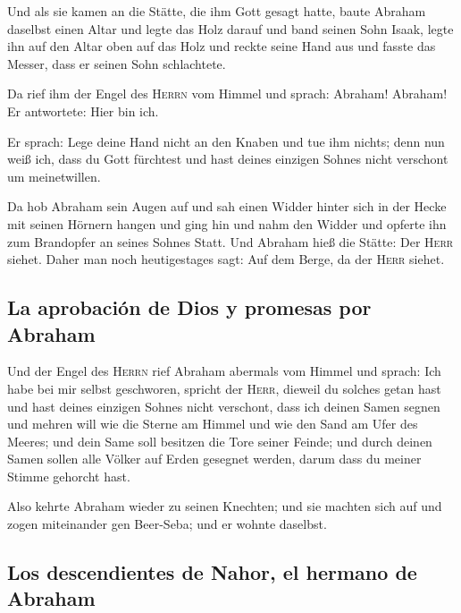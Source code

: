  Und als sie kamen an die Stätte, die ihm Gott gesagt
hatte, baute Abraham daselbst einen Altar und legte das Holz darauf und
band seinen Sohn Isaak, legte ihn auf den Altar oben auf das Holz
 und reckte seine Hand aus und fasste das Messer, dass er
seinen Sohn schlachtete.

 Da rief ihm der Engel des \textsc{Herrn} vom Himmel und
sprach: Abraham! Abraham! Er antwortete: Hier bin ich.

 Er sprach: Lege deine Hand nicht an den Knaben und tue
ihm nichts; denn nun weiß ich, dass du Gott fürchtest und hast deines
einzigen Sohnes nicht verschont um meinetwillen.

 Da hob Abraham sein Augen auf und sah einen Widder
hinter sich in der Hecke mit seinen Hörnern hangen und ging hin und nahm
den Widder und opferte ihn zum Brandopfer an seines Sohnes Statt.
 Und Abraham hieß die Stätte: Der \textsc{Herr} siehet.
Daher man noch heutigestages sagt: Auf dem Berge, da der \textsc{Herr}
siehet.

\hypertarget{la-aprobaciuxf3n-de-dios-y-promesas-por-abraham}{%
\subsection{La aprobación de Dios y promesas por
Abraham}\label{la-aprobaciuxf3n-de-dios-y-promesas-por-abraham}}

 Und der Engel des \textsc{Herrn} rief Abraham abermals
vom Himmel  und sprach: Ich habe bei mir selbst
geschworen, spricht der \textsc{Herr}, dieweil du solches getan hast und
hast deines einzigen Sohnes nicht verschont,  dass ich
deinen Samen segnen und mehren will wie die Sterne am Himmel und wie den
Sand am Ufer des Meeres; und dein Same soll besitzen die Tore seiner
Feinde;  und durch deinen Samen sollen alle Völker auf
Erden gesegnet werden, darum dass du meiner Stimme gehorcht hast.

 Also kehrte Abraham wieder zu seinen Knechten; und sie
machten sich auf und zogen miteinander gen Beer-Seba; und er wohnte
daselbst.

\hypertarget{los-descendientes-de-nahor-el-hermano-de-abraham}{%
\subsection{Los descendientes de Nahor, el hermano de
Abraham}\label{los-descendientes-de-nahor-el-hermano-de-abraham}}

